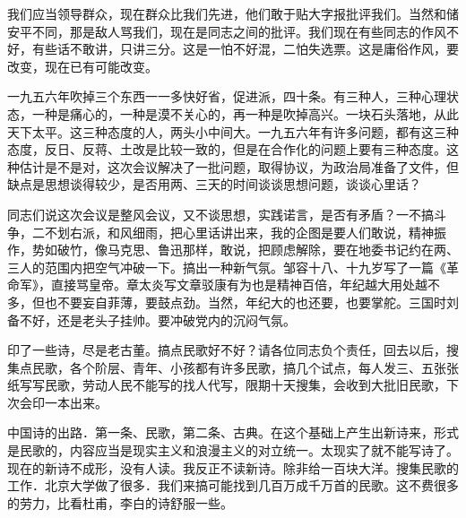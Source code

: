 我们应当领导群众，现在群众比我们先进，他们敢于贴大字报批评我们。当然和储安平不同，那是敌人骂我们，现在是同志之间的批评。我们现在有些同志的作风不好，有些话不敢讲，只讲三分。这是一怕不好混，二怕失选票。这是庸俗作风，要改变，现在已有可能改变。

一九五六年吹掉三个东西一一多快好省，促进派，四十条。有三种人，三种心理状态，一种是痛心的，一种是漠不关心的，再一种是吹掉高兴。一块石头落地，从此天下太平。这三种态度的人，两头小中间大。一九五六年有许多问题，都有这三种态度，反日、反蒋、土改是比较一致的，但是在合作化的问题上要有三种态度。这种估计是不是对，这次会议解决了一批问题，取得协议，为政治局准备了文件，但缺点是思想谈得较少，是否用两、三天的时间谈谈思想问题，谈谈心里话？

同志们说这次会议是整风会议，又不谈思想，实践诺言，是否有矛盾？一不搞斗争，二不划右派，和风细雨，把心里话讲出来，我的企图是要人们敢说，精神振作，势如破竹，像马克思、鲁迅那样，敢说，把顾虑解除，要在地委书记约在两、三人的范围内把空气冲破一下。搞出一种新气氛。邹容十八、十九岁写了一篇《革命军》，直接骂皇帝。章太炎写文章驳康有为也是精神百倍，年纪越大用处越不多，但也不要妄自菲薄，要鼓点劲。当然，年纪大的也还要，也要掌舵。三国时刘备不好，还是老头子挂帅。要冲破党内的沉闷气氛。

印了一些诗，尽是老古董。搞点民歌好不好？请各位同志负个责任，回去以后，搜集点民歌，各个阶层、青年、小孩都有许多民歌，搞几个试点，每人发三、五张张纸写写民歌，劳动人民不能写的找人代写，限期十天搜集，会收到大批旧民歌，下次会印一本出来。

中国诗的出路．第一条、民歌，第二条、古典。在这个基础上产生出新诗来，形式是民歌的，内容应当是现实主义和浪漫主义的对立统一。太现实了就不能写诗了。现在的新诗不成形，没有人读。我反正不读新诗。除非给一百块大洋。搜集民歌的工作．北京大学做了很多．我们来搞可能找到几百万成千万首的民歌。这不费很多的劳力，比看杜甫，李白的诗舒服一些。


